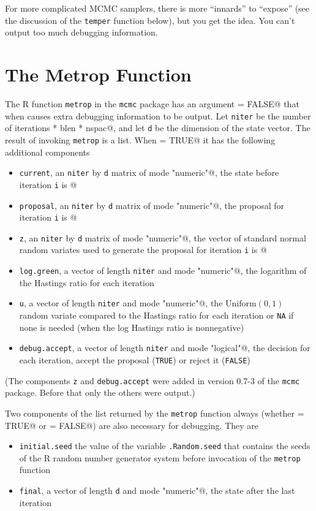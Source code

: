 \documentclass{article}
\begin{document}
For more complicated MCMC samplers, there is more ``innards'' to ``expose''
(see the discussion of the \texttt{temper} function below), but you get the
idea.  You can't output too much debugging information.

\section{The Metrop Function}

The R function \texttt{metrop} in the \texttt{mcmc} package has an argument
\verb@debug = FALSE@ that when \verb@TRUE@ causes extra debugging information
to be output.
Let \texttt{niter} be the number of iterations
\verb@nbatch * blen * nspac@, and let \texttt{d} be the dimension of the state
vector.  The result of invoking \texttt{metrop} is a list.  When
\verb@debug = TRUE@ it has the following additional components
\begin{itemize}
\item \texttt{current}, an \texttt{niter} by \texttt{d} matrix
    of mode \verb@"numeric"@, the state before iteration \texttt{i}
    is \verb@current[i, ]@
\item \texttt{proposal}, an \texttt{niter} by \texttt{d} matrix
    of mode \verb@"numeric"@, the proposal for iteration \texttt{i}
    is \verb@proposal[i, ]@
\item \texttt{z}, an \texttt{niter} by \texttt{d} matrix
    of mode \verb@"numeric"@, the vector of standard normal random variates
    used to generate the proposal for iteration \texttt{i}
    is \verb@z[i, ]@
\item \texttt{log.green}, a vector of length \texttt{niter}
    and mode \verb@"numeric"@, the logarithm of the Hastings ratio
    for each iteration
\item \texttt{u}, a vector of length \texttt{niter}
    and mode \verb@"numeric"@, the $\text{Uniform}(0, 1)$ random variate
    compared to the Hastings ratio for each iteration or \texttt{NA} if
    none is needed (when the log Hastings ratio is nonnegative)
\item \texttt{debug.accept}, a vector of length \texttt{niter}
    and mode \verb@"logical"@, the decision for each iteration,
    accept the proposal (\texttt{TRUE}) or reject it (\texttt{FALSE})
\end{itemize}
(The components \texttt{z} and \texttt{debug.accept} were added in
version 0.7-3 of the \texttt{mcmc} package.  Before that only the others
were output.)

Two components of the list returned by the \texttt{metrop} function always
(whether \verb@debug = TRUE@ or \verb@debug = FALSE@) are also necessary
for debugging.  They are
\begin{itemize}
\item \texttt{initial.seed} the value of the variable \texttt{.Random.seed}
    that contains the seeds of the R random number generator system before
    invocation of the \texttt{metrop} function
\item \texttt{final}, a vector of length \texttt{d} and mode \verb@"numeric"@,
    the state after the last iteration
\end{itemize}
\end{document}
